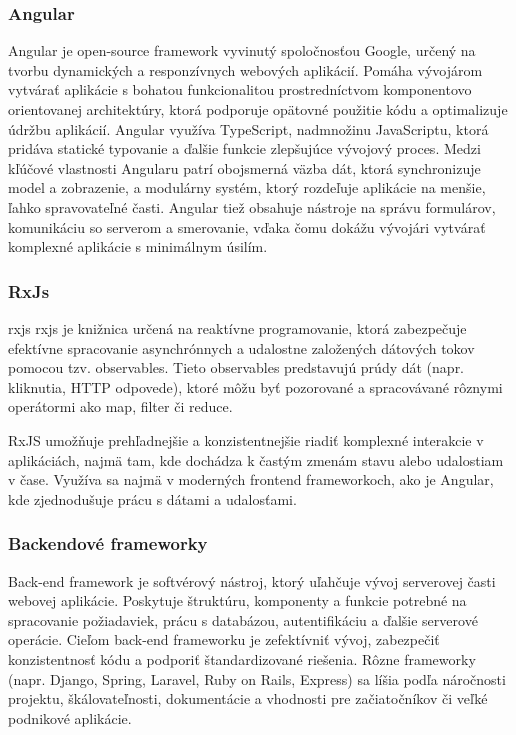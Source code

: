 \subsubsection{Angular}
Angular je open-source framework vyvinutý spoločnosťou Google, určený na tvorbu dynamických a responzívnych webových aplikácií.
Pomáha vývojárom vytvárať aplikácie s bohatou funkcionalitou prostredníctvom komponentovo orientovanej architektúry, ktorá podporuje opätovné použitie kódu a optimalizuje údržbu aplikácií.
Angular využíva TypeScript, nadmnožinu JavaScriptu, ktorá pridáva statické typovanie a ďalšie funkcie zlepšujúce vývojový proces. 
Medzi kľúčové vlastnosti Angularu patrí obojsmerná väzba dát, ktorá synchronizuje model a zobrazenie, a modulárny systém, ktorý rozdeľuje aplikácie na menšie, ľahko spravovateľné časti.
Angular tiež obsahuje nástroje na správu formulárov, komunikáciu so serverom a smerovanie, vďaka čomu dokážu vývojári vytvárať komplexné aplikácie s minimálnym úsilím. \cite{angular}

\subsubsection{RxJs}
\acrshort{rxjs} \acrfull{rxjs} je knižnica určená na reaktívne programovanie, ktorá zabezpečuje efektívne spracovanie asynchrónnych a udalostne založených dátových tokov pomocou tzv. observables. 
Tieto observables predstavujú prúdy dát (napr. kliknutia, HTTP odpovede), ktoré môžu byť pozorované a spracovávané rôznymi operátormi ako map, filter či reduce.

RxJS umožňuje prehľadnejšie a konzistentnejšie riadiť komplexné interakcie v aplikáciách, najmä tam, kde dochádza k častým zmenám stavu alebo udalostiam v čase.
Využíva sa najmä v moderných frontend frameworkoch, ako je Angular, kde zjednodušuje prácu s dátami a udalosťami.\cite{rxjs}
\subsubsection{Backendové frameworky}
Back-end framework je softvérový nástroj, ktorý uľahčuje vývoj serverovej časti webovej aplikácie. 
Poskytuje štruktúru, komponenty a funkcie potrebné na spracovanie požiadaviek, prácu s databázou, autentifikáciu a ďalšie serverové operácie. 
Cieľom back-end frameworku je zefektívniť vývoj, zabezpečiť konzistentnosť kódu a podporiť štandardizované riešenia. 
Rôzne frameworky (napr. Django, Spring, Laravel, Ruby on Rails, Express) sa líšia podľa náročnosti projektu, škálovateľnosti, dokumentácie a vhodnosti pre začiatočníkov či veľké podnikové aplikácie.\cite{backendframework}

